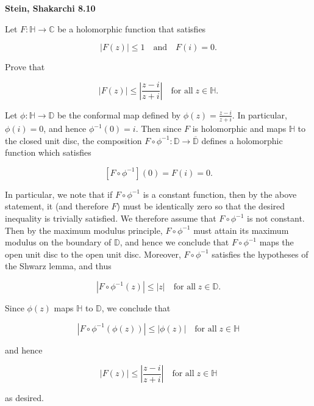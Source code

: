 \textbf{Stein, Shakarchi 8.10}

Let $F : \mathbb{H} \to \mathbb{C}$ be a holomorphic function that satisfies

$$
|F(z)| \leq 1 \quad \text{and} \quad F(i) = 0.
$$

Prove that

$$
|F(z)| \leq \left| \frac{z - i}{z + i}  \right| \quad \text{for all} \; z \in \mathbb{H}.
$$

\begin{solution}
  Let $\phi : \mathbb{H} \to \mathbb{D}$ be the conformal map defined by $\phi(z) = \frac{z - i}{z + i}$. In particular,
  $\phi(i) = 0$, and hence $\phi^{-1}(0) = i$. Then since $F$ is holomorphic and maps $\mathbb{H}$ to the closed unit 
  disc, the composition $F \circ \phi^{-1}: \mathbb{D} \to \overline{\mathbb{D}}$ defines a holomorphic function which satisfies

  $$
  \left[ F \circ \phi^{-1} \right] (0) = F(i) = 0.
  $$

  In particular, we note that if $F \circ \phi^{-1}$ is a constant function, then by the above statement, it (and 
  therefore $F$) must be identically zero so that the desired inequality is trivially satisfied. We therefore assume
  that $F \circ \phi^{-1}$ is not constant. Then by the maximum modulus principle, $F \circ \phi^{-1}$ must attain its
  maximum modulus on the boundary of $\mathbb{D}$, and hence we conclude that $F \circ \phi^{-1}$ maps the open unit 
  disc to the open unit disc. Moreover, $F \circ \phi^{-1}$ satisfies the hypotheses of the Shwarz lemma, and thus

  $$
  \left| F \circ \phi^{-1}(z) \right| \leq |z| \quad \text{for all} \; z \in \mathbb{D}.
  $$

  Since $\phi(z)$ maps $\mathbb{H}$ to $\mathbb{D}$, we conclude that

  $$
  \left| F \circ \phi^{-1}(\phi(z)) \right| \leq |\phi(z)| \quad \text{for all} \; z \in \mathbb{H}
  $$

  and hence

  $$
  \left| F(z) \right| \leq \left|\frac{z-i}{z+i}\right| \quad \text{for all} \; z \in \mathbb{H}
  $$

  as desired.
  \ \\
\end{solution}
